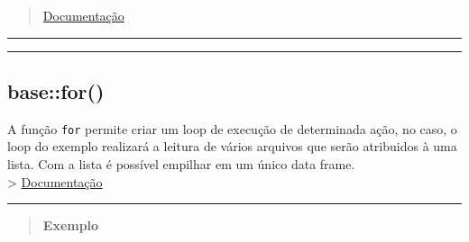 \documentclass[
]{book}
\theoremstyle{definition}
\theoremstyle{definition}
\theoremstyle{definition}
\theoremstyle{definition}
\theoremstyle{remark}
\begin{document}
\begin{quote}
\href{https://www.rdocumentation.org/packages/base/versions/3.6.2/topics/function}{Documentação}
\end{quote}

\begin{center}\rule{0.5\linewidth}{0.5pt}\end{center}

\begin{center}\rule{0.5\linewidth}{0.5pt}\end{center}

\hypertarget{basefor}{%
\subsection{base::for()}\label{basefor}}

A função \texttt{for} permite criar um loop de execução de determinada ação, no caso, o loop do exemplo realizará a leitura de vários arquivos que serão atribuidos à uma lista. Com a lista é possível empilhar em um único data frame.\\
\textgreater{} \href{https://www.rdocumentation.org/packages/base/versions/3.6.2/topics/Control}{Documentação}

\begin{center}\rule{0.5\linewidth}{0.5pt}\end{center}

\begin{quote}
\textbf{Exemplo}
\end{quote}
\end{document}
